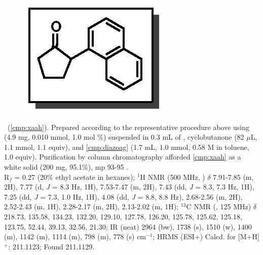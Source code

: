 \vspace{10pt}
\begin{figure}
  \vspace{-25pt}
  \begin{center}
    \includegraphics[scale=0.8]{chp_asymmetric/images/xaah}
  \end{center}
  \vspace{-30pt}
\end{figure}\noindent \textbf{\CMPxaah}\ (\ref{cmp:xaah}). Prepared
according to the representative procedure above using  (4.9 mg,
0.010 mmol, 1.0 mol \%) suspended in 0.3 mL of , cyclobutanone (82
$\mu$L, 1.1 mmol, 1.1 equiv), and \ref{cmp:diazoag} (1.7 mL, 1.0 mmol, 0.58 M in
toluene, 1.0 equiv). Purification by column chromatography afforded
\ref{cmp:xaah} as a white solid (200 mg, 95.1\%), mp 93-95 \degc.\\
R$_f$ = 0.27 (20\% ethyl acetate in hexanes); $^1$H NMR (500 MHz, )
$\delta$ 7.91-7.85 (m, 2H), 7.77 (d, \textit{J} =  8.3 Hz, 1H), 7.53-7.47 (m, 2H), 7.43
(dd, \textit{J} =  8.3, 7.3 Hz, 1H), 7.25 (dd, \textit{J} =  7.3, 1.0 Hz, 1H),
4.08 (dd, \textit{J} =  8.8, 8.8 Hz), 2.68-2.56 (m, 2H), 2.52-2.43 (m, 1H),
2.28-2.17 (m, 2H), 2.13-2.02 (m, 1H); $^{13}$C NMR (, 125 MHz)
$\delta$ 218.73, 135.58, 134.23, 132.20, 129.10, 127.78, 126.20, 125.78, 125.62,
125.18, 123.75, 52.44, 39.13, 32.56, 21.30; IR (neat) 2964 (bw), 1738 (s), 1510
(w), 1400 (m), 1142 (m), 1114 (m), 798 (m), 778 (s) cm$^{-1}$; HRMS (ESI+)
Calcd. for  [M+H]$^+$: 211.1123; Found 211.1129.

